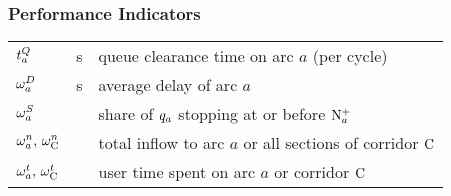 \subsubsection*{Performance Indicators}
\begin{tabu} to \textwidth {X[3,c] X[1,c] X[6,l]}
$ t_{a}^Q $ & s & queue clearance time on arc $a$ (per cycle)\\[2pt]
$ \omega_{a}^{D} $ & s & average delay of arc $a$ \\[2pt]
$ \omega_{a}^{S}$ & & share of $q_a$ stopping at or before $\mathrm{N}_{a}^{+}$ \\[2pt]
$ \omega_{a}^{n} \text{, } \omega_{\mathrm{C}}^{n} $ &  & total inflow to arc $a$ or all sections of corridor $\mathrm{C}$ \\[2pt]
$ \omega_{a}^{t} \text{, } \omega_{\mathrm{C}}^{t} $ &  & user time spent on arc $a$ or corridor $\mathrm{C}$ \\[2pt]
\end{tabu}